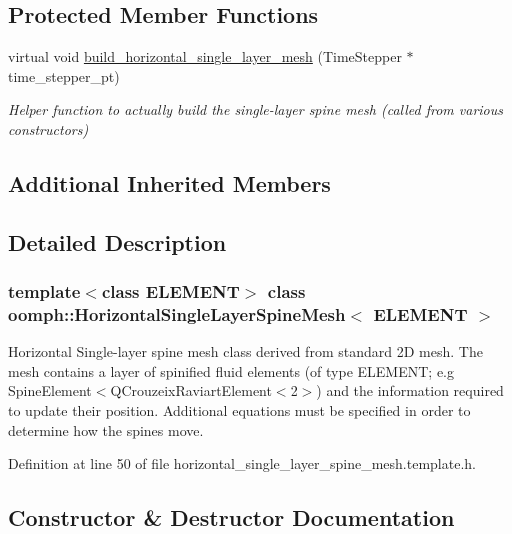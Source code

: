 \subsection*{Protected Member Functions}
\begin{DoxyCompactItemize}
\item 
virtual void \hyperlink{classoomph_1_1HorizontalSingleLayerSpineMesh_a9bd06cd24d2c48c499bf149b1773b442}{build\+\_\+horizontal\+\_\+single\+\_\+layer\+\_\+mesh} (Time\+Stepper $\ast$time\+\_\+stepper\+\_\+pt)
\begin{DoxyCompactList}\small\item\em Helper function to actually build the single-\/layer spine mesh (called from various constructors) \end{DoxyCompactList}\end{DoxyCompactItemize}
\subsection*{Additional Inherited Members}


\subsection{Detailed Description}
\subsubsection*{template$<$class E\+L\+E\+M\+E\+NT$>$\newline
class oomph\+::\+Horizontal\+Single\+Layer\+Spine\+Mesh$<$ E\+L\+E\+M\+E\+N\+T $>$}

Horizontal Single-\/layer spine mesh class derived from standard 2D mesh. The mesh contains a layer of spinified fluid elements (of type E\+L\+E\+M\+E\+NT; e.\+g Spine\+Element$<$Q\+Crouzeix\+Raviart\+Element$<$2$>$) and the information required to update their position. Additional equations must be specified in order to determine how the spines move. 

Definition at line 50 of file horizontal\+\_\+single\+\_\+layer\+\_\+spine\+\_\+mesh.\+template.\+h.



\subsection{Constructor \& Destructor Documentation}
\mbox{\label{classoomph_1_1HorizontalSingleLayerSpineMesh_a765856597150d37a20eabdb53e58d49c}} 
